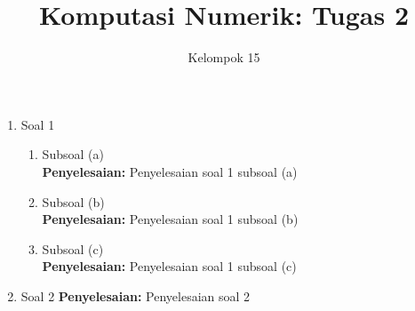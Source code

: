 \documentclass{article}
\title{\textbf{Komputasi Numerik: Tugas 2}}
\author{Kelompok 15}
\date{}
\newcommand{\penyelesaian}{\textbf{Penyelesaian: }}
\begin{document}
\maketitle

\begin{enumerate}
    \item Soal 1
    \begin{enumerate}
        \item Subsoal (a) \\
        \penyelesaian Penyelesaian soal 1 subsoal (a)

        \item Subsoal (b) \\
        \penyelesaian Penyelesaian soal 1 subsoal (b)

        \item Subsoal (c) \\
        \penyelesaian  Penyelesaian soal 1 subsoal (c)
    \end{enumerate}

    \item Soal 2
    \penyelesaian Penyelesaian soal 2


\end{enumerate}
\end{document}

